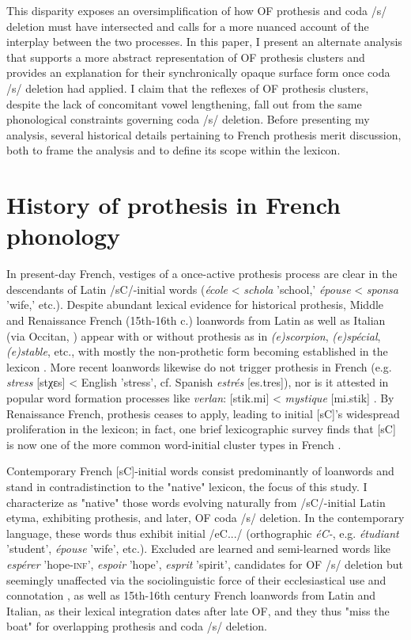 \documentclass[output=paper,colorlinks,citecolor=brown,
]{langscibook}
\begin{document}
This disparity exposes an oversimplification of how OF prothesis and coda /s/ deletion must have intersected and calls for a more nuanced account of the interplay between the two processes.  In this paper, I present an alternate analysis that supports a more abstract representation of OF prothesis clusters and provides an explanation for their synchronically opaque surface form once coda /s/ deletion had applied.  I claim that the reflexes of OF prothesis clusters, despite the lack of concomitant vowel lengthening, fall out from the same phonological constraints governing coda /s/ deletion.  Before presenting my analysis, several historical details pertaining to French prothesis merit discussion, both to frame the analysis and to define its scope within the lexicon.

\section{History of prothesis in French phonology}\label{sec:montano:2}
In present-day French, vestiges of a once-active prothesis process are clear in the descendants of Latin /sC/-initial words (\textit{école} < \textit{schola} 'school,' \textit{épouse} < \textit{sponsa} 'wife,' etc.).  Despite abundant lexical evidence for historical prothesis, Middle and Renaissance French (15th-16th c.) loanwords from Latin as well as Italian (via Occitan, \citealt{Sampson2003}) appear with or without prothesis as in \textit{(e)scorpion}, \textit{(e)spécial}, \textit{(e)stable}, etc., with mostly the non-prothetic form becoming established in the lexicon \citep{Pope1952, Sampson2003, Montaño2017}.  More recent loanwords likewise do not trigger prothesis in French (e.g. \textit{stress} [stχɛs] < English 'stress', cf. Spanish \textit{estrés} [es.tres]), nor is it attested in popular word formation processes like \textit{verlan}: [stik.mi] < \textit{mystique} [mi.stik] \citep{Sampson2010}.  By Renaissance French, prothesis ceases to apply, leading to initial [sC]'s widespread proliferation in the lexicon; in fact, one brief lexicographic survey finds that [sC] is now one of the more common word-initial cluster types in French \citep{Montaño2017}.
	
Contemporary French [sC]-initial words consist predominantly of loanwords and stand in contradistinction to the "native" lexicon, the focus of this study.  I characterize as "native" those words evolving naturally from /sC/-initial Latin etyma, exhibiting prothesis, and later, OF coda /s/ deletion. In the contemporary language, these words thus exhibit initial /eC.../ (orthographic \textit{éC-}, e.g. \textit{étudiant} 'student', \textit{épouse} 'wife', etc.).  Excluded are learned and semi-learned words like \textit{espérer} 'hope-\textsc{inf}', \textit{espoir} 'hope', \textit{esprit} 'spirit', candidates for OF /s/ deletion but seemingly unaffected via the sociolinguistic force of their ecclesiastical use and connotation \citep{Pope1952}, as well as 15th-16th century French loanwords from Latin and Italian, as their lexical integration dates after late OF, and they thus "miss the boat" for overlapping prothesis and coda /s/ deletion.
\end{document}
